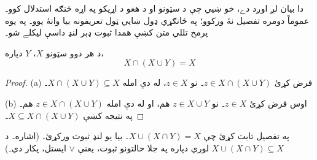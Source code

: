 \documentclass[../../../include/open-logic-section]{subfiles}
\begin{document}
\begin{explain}
دا بيان لږ اوږد دے، خو ښيي چې د سټونو او د هغو د اړيکو په اړه څنګه استدلال کوو۔ عموماً دومره تفصيل نۀ ورکوو؛ په ځانګړي ډول ښايي ټول تعريفونه بيا وانۀ يوو۔ په يوه پرمخ تللي متن کښې همدا ثبوت ډېر لنډ داسې ليکلے شو۔
\end{explain}

\begin{prop}[جذب]
د هر دوو سټونو $X$، $Y$ دپاره،
\[
X \cap (X \cup Y) = X
\]
\end{prop}

\begin{proof}
(a) فرض کړئ $z \in X \cap (X \cup Y)$۔ نو $z \in X$، له دې امله $X \cap (X
  \cup Y) \subseteq X$۔

(b) اوس فرض کړئ $z \in X$۔ نو $z \in X \cup Y$ هم، او له دې امله $z \in X \cap (X \cup Y)$ هم۔ په نتيجه کښې $X \subseteq X \cap (X \cup
  Y)$۔
\end{proof}

\begin{prob}
په تفصيل ثابت کړئ چې $X \cup (X \cap Y) = X$۔ بيا يو لنډ ثبوت ورکړئ۔ (اشاره۔ د $X \cup (X \cap Y) \subseteq X$ لوري دپاره په جلا حالتونو ثبوت، يعنې $\lor$ ايستل، پکار دي۔)
\end{prob}
\end{document}
